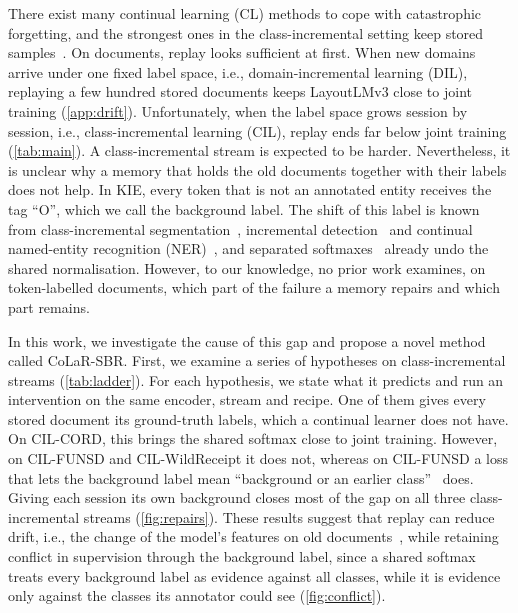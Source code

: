 \documentclass[10pt,twocolumn,letterpaper]{article}
\begin{document}
There exist many continual learning (CL) methods to cope with catastrophic forgetting, and the strongest ones in the class-incremental setting keep stored samples~\citep{masana2022class,wang2024survey}. On documents, replay looks sufficient at first. When new domains arrive under one fixed label space, i.e., domain-incremental learning (DIL), replaying a few hundred stored documents keeps LayoutLMv3 close to joint training (\cref{app:drift}). Unfortunately, when the label space grows session by session, i.e., class-incremental learning (CIL), replay ends far below joint training (\cref{tab:main}). A class-incremental stream is expected to be harder. Nevertheless, it is unclear why a memory that holds the old documents together with their labels does not help. In KIE, every token that is not an annotated entity receives the tag ``O'', which we call the background label. The shift of this label is known from class-incremental segmentation~\citep{cermelli2020mib,douillard2021plop}, incremental detection~\citep{liu2023abr,mo2024bpf} and continual named-entity recognition (NER)~\citep{monaikul2021extendner,zhang2023cpfd}, and separated softmaxes~\citep{ahn2021ssil,kim2022more,liu2023ice} already undo the shared normalisation. However, to our knowledge, no prior work examines, on token-labelled documents, which part of the failure a memory repairs and which part remains.



In this work, we investigate the cause of this gap and propose a novel method called CoLaR-SBR. First, we examine a series of hypotheses on class-incremental streams (\cref{tab:ladder}). For each hypothesis, we state what it predicts and run an intervention on the same encoder, stream and recipe. One of them gives every stored document its ground-truth labels, which a continual learner does not have. On CIL-CORD, this brings the shared softmax close to joint training. However, on CIL-FUNSD and CIL-WildReceipt it does not, whereas on CIL-FUNSD a loss that lets the background label mean ``background or an earlier class''~\citep{cermelli2020mib} does. Giving each session its own background closes most of the gap on all three class-incremental streams (\cref{fig:repairs}). These results suggest that replay can reduce drift, i.e., the change of the model's features on old documents~\citep{ramasesh2021anatomy}, while retaining conflict in supervision through the background label, since a shared softmax treats every background label as evidence against all classes, while it is evidence only against the classes its annotator could see (\cref{fig:conflict}).
\end{document}
